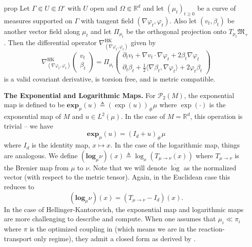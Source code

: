 \documentclass[11pt]{article}
\newcommand{\man}{M}
\newcommand{\HK}{\operatorname{HK}}
\begin{document}
\begin{restatable}{prop}{} \label{HK covariant deriv}
    Let $\Gamma \Subset U \Subset \Omega ^\circ$ with $U$ open and $\Omega \Subset \mathbb{R}^d$ and let $(\mu_t)_{t\geq 0}$ be a curve of measures supported on $\Gamma$ with tangent field $(\nabla \varphi_t, \varphi_t)$. Also let $(v_t, \beta_t)$ be another vector field along $\mu_t$ and let $\Pi_{\mu_t}$ be the orthogonal projection onto $T_{\mu_t}\mathfrak{M}_+$. Then the differential operator $\nabla_{(\nabla\varphi_t, \varphi_t)}^{\HK}$ given by
    \begin{equation*}
        \nabla_{(\nabla\varphi_t, \varphi_t)}^{\HK} \begin{pmatrix}
            v_t \\
            \beta_t
        \end{pmatrix} = \Pi_{\mu_t}\begin{pmatrix}
            \partial_t v_t + \nabla v_t \cdot \nabla \varphi_t + 2\beta_t\nabla\varphi_t \\
            \partial_t \beta_t + \frac{1}{2}\langle \nabla \beta_t, \nabla \varphi_t\rangle + 2\varphi_t\beta_t
        \end{pmatrix}
    \end{equation*}
    is a valid covariant derivative, is torsion free, and is metric compatible. 
\end{restatable}

\noindent \textbf{The Exponential and Logarithmic Maps.} For $\mathcal{P}_{2}(\man)$, the exponential map is defined to be $\mathbf{exp}_{\mu}(u) \triangleq (\exp(u))_\#\mu$ where $\exp(\cdot)$ is the exponential map of $\man$ and $u \in L^2(\mu)$. In the case of $\man = \mathbb{R}^d$, this operation is trivial -- we have
\begin{equation}\label{eq: wasserstein euclidean expmap}
    \mathbf{exp}_\mu(u) = (I_d + u)_\# \mu
\end{equation}
where $I_d$ is the identity map, $x \mapsto x$. In the case of the logarithmic map, things are analogous. We define $(\mathbf{log}_\mu\nu) (x) \triangleq \log_x(T_{\mu \rightarrow \nu}(x))$ where $T_{\mu \rightarrow \nu}$ is the Brenier map from $\mu$ to $\nu$. Note that we will denote $\overline{\log}$ as the normalized vector (with respect to the metric tensor). Again, in the Euclidean case this reduces to
\begin{equation}\label{eq: wasserstein euclidean logmap}
    (\mathbf{log}_\mu\nu )(x) = (T_{\mu \rightarrow \nu} - I_d)(x).
\end{equation}
In the case of Hellinger-Kantorovich, the exponential map and logarithmic maps are more challenging to describe and compute. When one assumes that $\mu_i \ll \pi_i$ where $\pi$ is the optimized coupling in  (which means we are in the reaction-transport only regime), they admit a closed form as derived by \citet{cai2022linearized}. 
\end{document}
